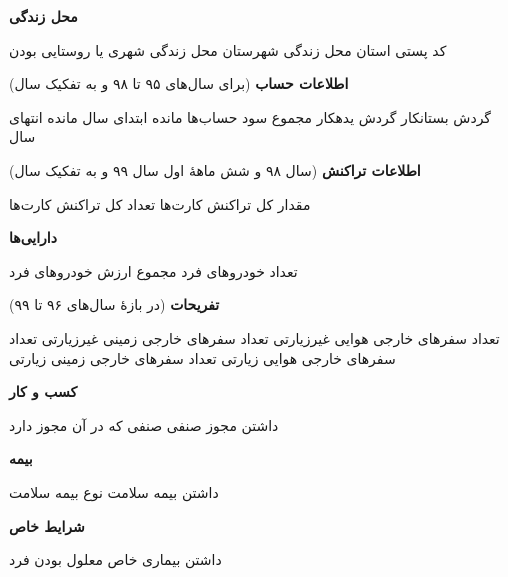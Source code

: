  \textbf{محل زندگی}
\begin{multicols}{2}
	 کد پستی
	 استان محل زندگی
	 شهرستان محل زندگی
	 شهری یا روستایی بودن
	
\end{multicols}

 \textbf{اطلاعات حساب} (برای سال‌های ۹۵ تا ۹۸ و به تفکیک سال)
\begin{multicols}{2}
	 گردش بستانکار
	 گردش یدهکار
	 مجموع سود حساب‌ها
	 مانده ابتدای سال
	 مانده انتهای سال
	
\end{multicols}

 \textbf{اطلاعات تراکنش} (سال ۹۸ و شش ماههٔ اول سال ۹۹ و به تفکیک سال)
\begin{multicols}{2}
	 مقدار کل تراکنش کارت‌ها 
	 تعداد کل تراکنش کارت‌ها 
	
\end{multicols}

 \textbf{دارایی‌ها}
\begin{multicols}{2}
	 تعداد خودروهای فرد
	 مجموع ارزش خودروهای فرد 
	
\end{multicols}


 \textbf{تفریحات} (در بازهٔ سال‌های ۹۶ تا ۹۹)
\begin{multicols}{2}
	 تعداد سفرهای خارجی هوایی غیرزیارتی
	 تعداد سفرهای خارجی زمینی غیرزیارتی
	 تعداد سفرهای خارجی هوایی زیارتی
	 تعداد سفرهای خارجی زمینی زیارتی
	
\end{multicols}


 \textbf{کسب و کار}
\begin{multicols}{2}
	 داشتن مجوز صنفی
	 صنفی که در آن مجوز دارد 
	
\end{multicols}


 \textbf{بیمه}
\begin{multicols}{2}
	 داشتن بیمه سلامت
	 نوع بیمه سلامت
	
\end{multicols}


 \textbf{شرایط خاص}
\begin{multicols}{2}
	 داشتن بیماری خاص
	 معلول بودن فرد
	
\end{multicols}


